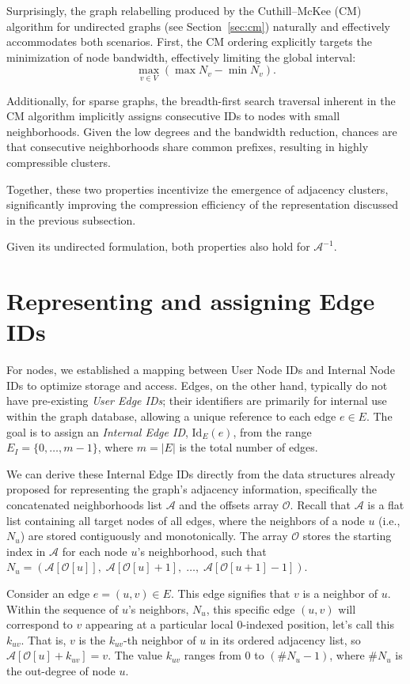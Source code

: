 Surprisingly, the graph relabelling produced by the Cuthill–McKee (CM) algorithm for undirected graphs (see Section~\ref{sec:cm}) naturally and effectively accommodates both scenarios. First, the CM ordering explicitly targets the minimization of node bandwidth, effectively limiting the global interval:
\[
\max_{v \in V} \left(\max N_v - \min N_v\right).
\]

Additionally, for sparse graphs, the breadth-first search traversal inherent in the CM algorithm implicitly assigns consecutive IDs to nodes with small neighborhoods. Given the low degrees and the bandwidth reduction, chances are that consecutive neighborhoods share common prefixes, resulting in highly compressible clusters.

Together, these two properties incentivize the emergence of adjacency clusters, significantly improving the compression efficiency of the representation discussed in the previous subsection.

Given its undirected formulation, both properties also hold for $\mathcal A^{-1}$.


\section{Representing and assigning Edge IDs}

For nodes, we established a mapping between User Node IDs and Internal Node IDs to optimize storage and access. Edges, on the other hand, typically do not have pre-existing \emph{User Edge IDs}; their identifiers are primarily for internal use within the graph database, allowing a unique reference to each edge $e \in E$. The goal is to assign an \emph{Internal Edge ID}, $\mathrm{Id}_E(e)$, from the range $E_I = \{0, \dots, m-1\}$, where $m = |E|$ is the total number of edges.

We can derive these Internal Edge IDs directly from the data structures already proposed for representing the graph's adjacency information, specifically the concatenated neighborhoods list $\mathcal{A}$ and the offsets array $\mathcal{O}$. Recall that $\mathcal{A}$ is a flat list containing all target nodes of all edges, where the neighbors of a node $u$ (i.e., $N_u$) are stored contiguously and monotonically. The array $\mathcal{O}$ stores the starting index in $\mathcal{A}$ for each node $u$'s neighborhood, such that $N_u = (\mathcal{A}[\mathcal{O}[u]], \;\mathcal{A}[\mathcal{O}[u]+1],\; \dots, \; \mathcal{A}[\mathcal{O}[u+1]-1])$.

Consider an edge $e = (u, v) \in E$. This edge signifies that $v$ is a neighbor of $u$. Within the sequence of $u$'s neighbors, $N_u$, this specific edge $(u,v)$ will correspond to $v$ appearing at a particular local 0-indexed position, let's call this $k_{uv}$. That is, $v$ is the $k_{uv}$-th neighbor of $u$ in its ordered adjacency list, so $\mathcal{A}[\mathcal{O}[u] + k_{uv}] = v$. The value $k_{uv}$ ranges from $0$ to $(\#N_u - 1)$, where $\#N_u$ is the out-degree of node $u$.

